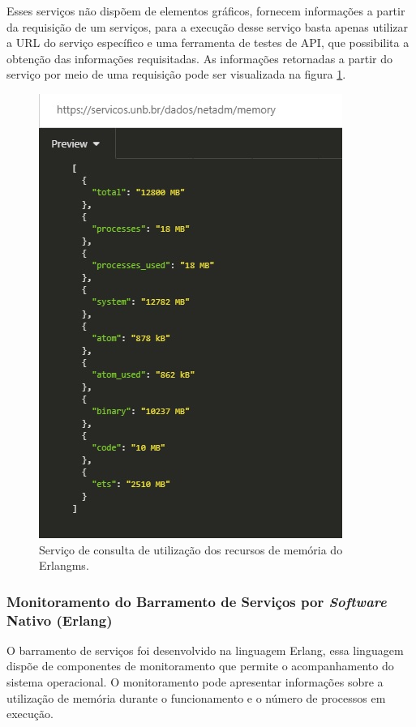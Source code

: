Esses serviços não dispõem de elementos gráficos, fornecem informações a partir da requisição de um serviços, para a execução desse serviço basta apenas utilizar a \acrshort{URL} do serviço específico e uma ferramenta de testes de \acrshort{API}, que possibilita a obtenção das informações requisitadas. As informações retornadas a partir do serviço por meio de uma requisição pode ser visualizada na figura \ref{fun:fig:memoriaEMS}.

\begin{figure}[H]
	\begin{center}
	\includegraphics[scale = 0.90]{img/monitoramentoEMS.jpg}
		\caption{Serviço de consulta de utilização dos recursos de memória do Erlangms.}
		\label{fun:fig:memoriaEMS}
	\end{center}
\end{figure}

\subsubsection{Monitoramento do Barramento de Serviços por \textit{Software} Nativo (Erlang)}
O barramento de serviços foi desenvolvido na linguagem Erlang, essa linguagem dispõe de componentes de monitoramento que permite o acompanhamento do sistema operacional. O monitoramento pode apresentar informações sobre a utilização de memória durante o funcionamento e o número de processos em execução. 

